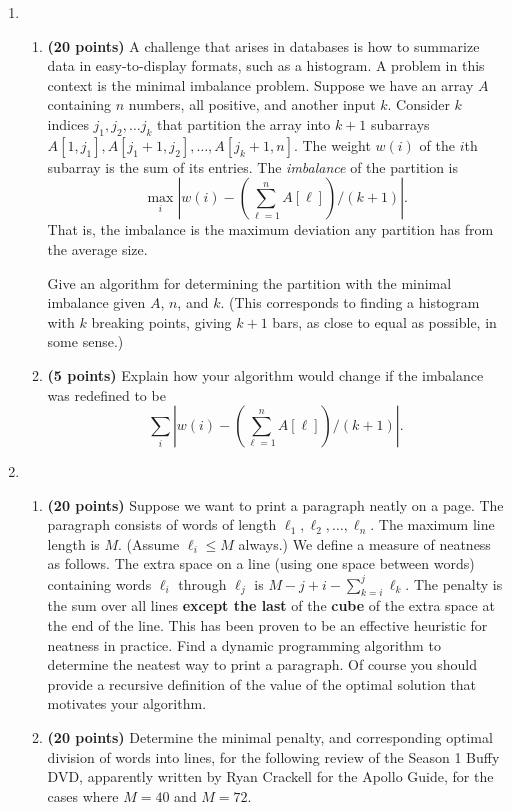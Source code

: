 \documentclass[10pt]{article}
\begin{document}
\begin{enumerate}


\item
\begin{enumerate}
\item
{\bf (20 points)}
A challenge that arises in databases is how to summarize data in
easy-to-display formats, such as a histogram.  A problem in this context
is the minimal imbalance problem.
Suppose we have an array $A$ containing $n$ numbers, all positive, 
and another input $k$.  Consider $k$ indices $j_1,j_2,\ldots j_k$ that
partition the array into $k+1$ subarrays $A[1,j_1],A[j_1+1,j_2],\ldots,
A[j_{k}+1,n]$.  The weight $w(i)$ of the $i$th subarray is the sum
of its entries.  The {\em imbalance} of the partition is
$$\max_i \left |w(i) - \left (\sum_{\ell = 1}^n A[\ell] \right ) / \left (k+1 \right ) \right |.$$
That is, the imbalance is the maximum deviation any partition has
from the average size.  

Give an algorithm for determining the partition with the minimal 
imbalance given $A$, $n$, and $k$.  (This corresponds to finding a histogram with $k$ 
breaking points, giving $k+1$ bars, as close to equal as possible, in some sense.)

\item
{\bf (5 points)}
Explain how your algorithm would change if the imbalance was redefined
to be
$$\sum_i \left |w(i) - \left (\sum_{\ell = 1}^n A[\ell] \right ) / \left (k+1 \right ) \right |.$$
\end{enumerate}

\item
\begin{enumerate}
\item
{\bf (20 points)}
Suppose we want to print a paragraph neatly on a page.  The
paragraph consists of words of length $\ell_1,\ell_2,\ldots,\ell_n$.
The maximum line length is $M$.  (Assume $\ell_i \leq M$ always.)  We
define a measure of neatness as follows.  The extra space on a line
(using one space between words) containing words $\ell_i$ through
$\ell_j$ is $M-j+i-\sum_{k=i}^j \ell_k$.  The penalty is the sum over
all lines {\bf except the last} of the {\bf cube} of the extra space
at the end of the line.  This has been proven to be an effective
heuristic for neatness in practice.  Find a dynamic programming
algorithm to determine the neatest way to print a paragraph.  Of
course you should provide a recursive definition of the value of the
optimal solution that motivates your algorithm.  
\item
{\bf (20 points)}
Determine the minimal penalty, and corresponding optimal division of words into lines, for the following
review of the Season 1 Buffy DVD, apparently written by Ryan Crackell
for the Apollo Guide, for the cases where $M = 40$ and $M = 72$. 


\end{enumerate}
\end{enumerate}
\end{document}
